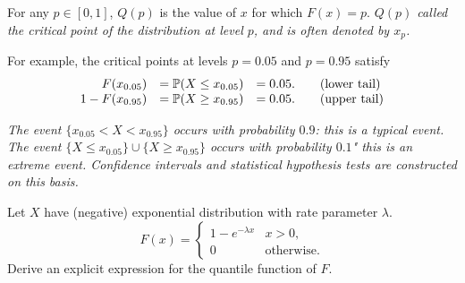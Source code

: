 For any $p\in[0,1]$, $Q(p)$ is the value of $x$ for which $F(x)=p$.
\ben
\it $Q(p)$ called the \emph{critical point} of the distribution at level $p$, and is often denoted by $x_p$.
\een

For example, the critical points at levels $p=0.05$ and $p=0.95$ satisfy
\[\begin{array}{rlll}
F(x_{0.05}) & = \mathbb{P}(X\leq x_{0.05}) & = 0.05. 		& \quad\text{(lower tail)} \\
1-F(x_{0.95}) & = \mathbb{P}(X\geq x_{0.95}) & = 0.05. 	& \quad\text{(upper tail)}
\end{array}\]

\begin{remark}
\bit
\it The event $\{x_{0.05} < X < x_{0.95}\}$ occurs with probability $0.9$: this is a \emph{typical} event.
\it The event $\{X\leq x_{0.05}\}\cup\{X\geq x_{0.95}\}$ occurs with probability $0.1$" this is an \emph{extreme} event.
\it Confidence intervals and statistical hypothesis tests are constructed on this basis.
\eit
\end{remark}

\begin{example}
Let $X$ have (negative) exponential distribution with rate parameter $\lambda$. %
\[
F(x) = \begin{cases}
	1 - e^{-\lambda x}	& x > 0, \\
	0					& \text{otherwise.}
\end{cases}
\]
Derive an explicit expression for the quantile function of $F$.
\end{example}


